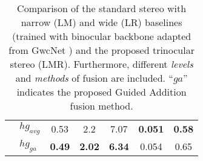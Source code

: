\documentclass[10pt,twocolumn,letterpaper]{article}
\begin{document}
\begin{table}[tbp]
\begin{center}
\begin{tabular}{@{\hskip1pt}l@{\hskip1pt}|@{\hskip1pt}l@{\hskip1pt}|@{\hskip1pt}c@{\hskip1pt}|@{\hskip1pt}c@{\hskip1pt}|@{\hskip1pt}c@{\hskip1pt}|@{\hskip1pt}c@{\hskip1pt}|@{\hskip1pt}c@{\hskip1pt}}
			&\hspace{0.1cm}${hg_{avg}}$     &  0.53        &   2.2      &  7.07    &   \textbf{0.051}  &   \textbf{0.58}     \\
			&\hspace{0.1cm}${hg_{ga}}$      &  \textbf{0.49}        &   \textbf{2.02}      &  \textbf{6.34}    &  0.054   &   0.65      \\  \hline
		\end{tabular}
	\end{center}
	\vspace{-0.3cm}
	\caption{Comparison of the standard stereo with narrow (LM) and wide (LR) baselines (trained with binocular backbone adapted from GwcNet \cite{guo2019group}) and the proposed trinocular stereo (LMR). Furthermore, different \emph{levels} and \emph{methods} of fusion are included. \enquote{${ga}$} indicates the proposed Guided Addition fusion method.}
	\label{tab:comb}
\end{table}
\end{document}
